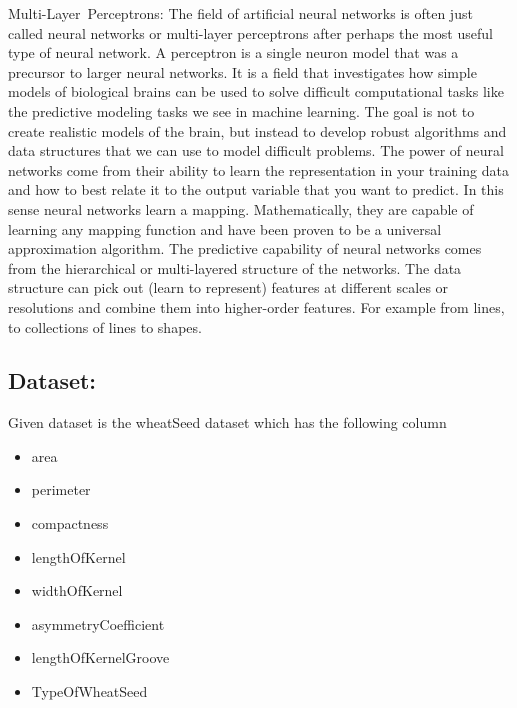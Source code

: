 \documentclass[11pt]{article}
\providecommand{\tightlist}{%
      \setlength{\itemsep}{0pt}\setlength{\parskip}{0pt}}
\begin{document}
Multi-Layer~Perceptrons: The field of artificial neural networks is
often just called neural networks or multi-layer perceptrons after
perhaps the most useful type of neural network. A perceptron is a single
neuron model that was a precursor to larger neural networks. It is a
field that investigates how simple models of biological brains can be
used to solve difficult computational tasks like the predictive modeling
tasks we see in machine learning. The goal is not to create realistic
models of the brain, but instead to develop robust algorithms and data
structures that we can use to model difficult problems. The power of
neural networks come from their ability to learn the representation in
your training data and how to best relate it to the output variable that
you want to predict. In this sense neural networks learn a mapping.
Mathematically, they are capable of learning any mapping function and
have been proven to be a universal approximation algorithm. The
predictive capability of neural networks comes from the hierarchical or
multi-layered structure of the networks. The data structure can pick out
(learn to represent) features at different scales or resolutions and
combine them into higher-order features. For example from lines, to
collections of lines to shapes.

    \subsection{Dataset:}\label{dataset}

Given dataset is the wheatSeed dataset which has the following column

\begin{itemize}
\tightlist
\item
  area
\item
  perimeter
\item
  compactness
\item
  lengthOfKernel
\item
  widthOfKernel
\item
  asymmetryCoefficient
\item
  lengthOfKernelGroove
\item
  TypeOfWheatSeed
\end{itemize}
\end{document}
